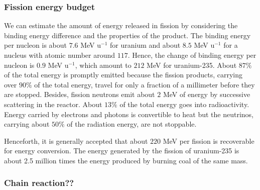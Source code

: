 \documentclass[nofootinbib,preprint,aip,pra]{revtex4-1}
\begin{document}
        \subsubsection{Fission energy budget}
        We can estimate the amount of energy released in fission by considering the binding energy difference
        and the properties of the product.
        The binding energy per nucleon is about $7.6$ MeV u${}^{-1}$ for uranium and about $8.5$ MeV u${}^{-1}$
        for a nucleus with atomic number around $117$. Hence, the change of binding energy per nucleon is
        $0.9$ MeV u${}^{-1}$, which amount to $212$ MeV for uranium-235.
        About $87\%$ of the total energy is promptly emitted because
        the fission products, carrying over $90\%$ of the total energy, travel for only a fraction of a
        millimeter before they are stopped. Besides, fission neutrons emit about $2$ MeV of energy by
        successive scattering in the reactor.
        About $13\%$ of the total energy goes into radioactivity. Energy carried by electrons and photons is
        convertible to heat but the neutrinos, carrying about $50\%$ of the radiation energy, are not stoppable.

        Henceforth, it is generally accepted that about $220$ MeV per fission is recoverable for energy conversion.
        The energy generated by the fission of uranium-235 is 
        about 2.5 million times the energy produced by burning coal of the same mass.\cite{e17}
        \subsubsection{Chain reaction??}
\end{document}
